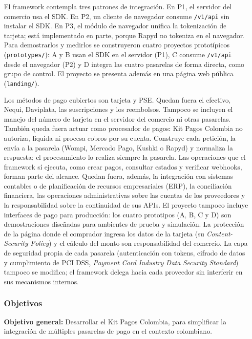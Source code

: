 El framework contempla tres patrones de integración. En P1, el servidor del comercio usa el SDK. En P2, un cliente de navegador consume \texttt{/v1/api} sin instalar el SDK. En P3, el módulo de navegador unifica la tokenización de tarjeta; está implementado en parte, porque Rapyd no tokeniza en el navegador. Para demostrarlos y medirlos se construyeron cuatro proyectos prototípicos (\texttt{prototypes/}): A y B usan el SDK en el servidor (P1), C consume \texttt{/v1/api} desde el navegador (P2) y D integra las cuatro pasarelas de forma directa, como grupo de control. El proyecto se presenta además en una página web pública (\texttt{landing/}).

Los métodos de pago cubiertos son tarjeta y PSE. Quedan fuera el efectivo, Nequi, Daviplata, las suscripciones y los reembolsos. Tampoco se incluyen el manejo del número de tarjeta en el servidor del comercio ni otras pasarelas. También queda fuera actuar como procesador de pagos: Kit Pagos Colombia no autoriza, liquida ni procesa cobros por su cuenta. Construye cada petición, la envía a la pasarela (Wompi, Mercado Pago, Kushki o Rapyd) y normaliza la respuesta; el procesamiento lo realiza siempre la pasarela. Las operaciones que el framework sí ejecuta, como crear pagos, consultar estados y verificar webhooks, forman parte del alcance. Quedan fuera, además, la integración con sistemas contables o de planificación de recursos empresariales (ERP), la conciliación financiera, las operaciones administrativas sobre las cuentas de los proveedores y la responsabilidad sobre la continuidad de sus APIs. El proyecto tampoco incluye interfaces de pago para producción: los cuatro prototipos (A, B, C y D) son demostraciones diseñadas para ambientes de prueba y simulación. La protección de la página donde el comprador ingresa los datos de la tarjeta (su \textit{Content-Security-Policy}) y el cálculo del monto son responsabilidad del comercio. La capa de seguridad propia de cada pasarela (autenticación con tokens, cifrado de datos y cumplimiento de PCI DSS, \textit{Payment Card Industry Data Security Standard}) tampoco se modifica; el framework delega hacia cada proveedor sin interferir en sus mecanismos internos.

\subsubsection{Objetivos}

\textbf{Objetivo general:} Desarrollar el Kit Pagos Colombia, para simplificar la integración de múltiples pasarelas de pago en el contexto colombiano.

